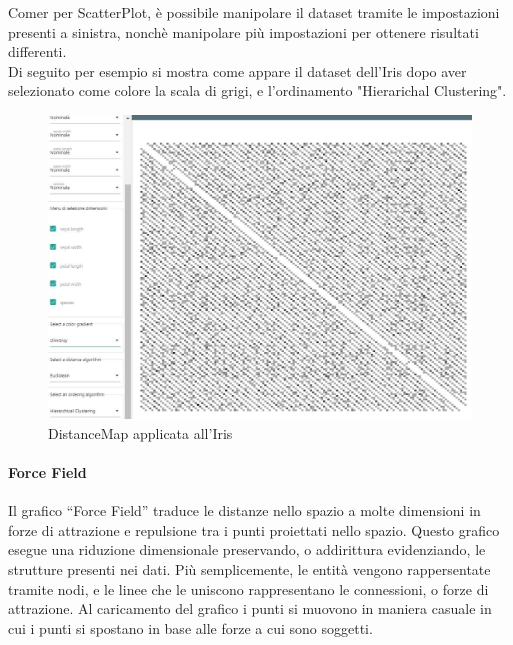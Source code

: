 \documentclass[../manuale_utente.tex]{subfiles}
\begin{document}
Comer per ScatterPlot, è possibile manipolare il dataset tramite le impostazioni presenti a sinistra, nonchè manipolare più impostazioni per ottenere risultati differenti.\\
Di seguito per esempio si mostra come appare il dataset dell'Iris dopo aver selezionato come colore la scala di grigi, e l'ordinamento "Hierarichal Clustering".


\begin{figure}[H]
	\centering
	\includegraphics[width=18cm]{img/dm/iris_clustering_euclideo_dm.jpg}
	\caption{DistanceMap applicata all'Iris}
\end{figure}


\paragraph{Force Field}
    \label{par:vis_force_field}
Il grafico “Force Field” traduce le distanze nello spazio a molte dimensioni in forze di attrazione e repulsione tra i punti proiettati nello spazio. 
Questo grafico esegue una riduzione dimensionale preservando, o addirittura evidenziando, le strutture presenti nei dati. Più semplicemente, le entità vengono
rappersentate tramite nodi, e le linee che le uniscono rappresentano le connessioni, o forze di attrazione. Al caricamento del grafico i punti si muovono in maniera
casuale in cui i punti si spostano in base alle forze a cui sono soggetti. 
\end{document}

